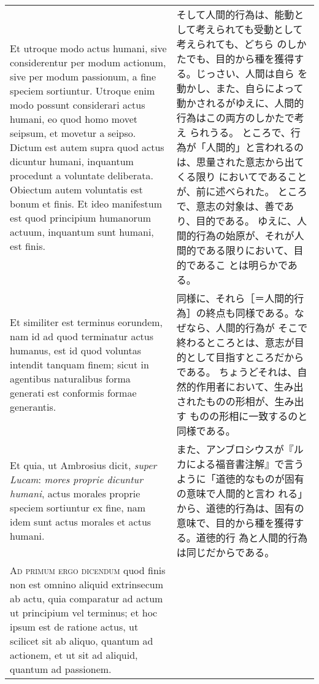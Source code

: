 \documentclass[10pt]{jsarticle} %
\begin{document}
\begin{longtable}{p{21em}p{21em}}
Et utroque modo actus humani, sive
considerentur per modum actionum, sive per modum passionum, a fine
speciem sortiuntur. Utroque enim modo possunt considerari actus humani,
eo quod homo movet seipsum, et movetur a seipso. Dictum est autem supra
quod actus dicuntur humani, inquantum procedunt a voluntate
deliberata. Obiectum autem voluntatis est bonum et finis. Et ideo
manifestum est quod principium humanorum actuum, inquantum sunt humani,
est finis. 


&

そして人間的行為は、能動として考えられても受動として考えられても、どちら
 のしかたでも、目的から種を獲得する。じっさい、人間は自ら
 を動かし、また、自らによって動かされるがゆえに、人間的行為はこの両方のしかたで考え
 られうる。
ところで、行為が「人間的」と言われるのは、思量された意志から出てくる限り
 においてであることが、前に述べられた。
ところで、意志の対象は、善であり、目的である。
ゆえに、人間的行為の始原が、それが人間的である限りにおいて、目的であるこ
 とは明らかである。


\\



Et similiter est terminus eorundem, nam id ad quod terminatur
actus humanus, est id quod voluntas intendit tanquam finem; sicut in
agentibus naturalibus forma generati est conformis formae generantis. 

&


同様に、それら［＝人間的行為］の終点も同様である。なぜなら、人間的行為が
 そこで終わるところとは、意志が目的として目指すところだからである。
ちょうどそれは、自然的作用者において、生み出されたものの形相が、生み出す
 ものの形相に一致するのと同様である。


\\

Et
quia, ut Ambrosius dicit, {\itshape super Lucam}: {\itshape mores proprie dicuntur humani},
actus morales proprie speciem sortiuntur ex fine, nam idem sunt actus
morales et actus humani.

&





また、アンブロシウスが『ルカによる福音書注解』で言うように「道徳的なものが固有の意味で人間的と言わ
 れる」から、道徳的行為は、固有の意味で、目的から種を獲得する。道徳的行
 為と人間的行為は同じだからである。


\\


{\scshape Ad primum ergo dicendum} quod finis non
est omnino aliquid extrinsecum ab actu, quia comparatur ad actum ut
principium vel terminus; et hoc ipsum est de ratione actus, ut scilicet
sit ab aliquo, quantum ad actionem, et ut sit ad aliquid, quantum ad
passionem.


\end{longtable}
\end{document}
